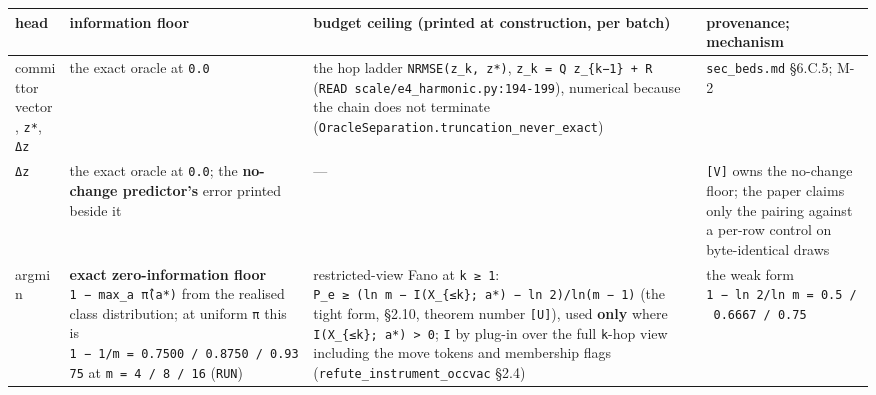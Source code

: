 \documentclass[11pt,a4paper]{article}
\newcounter{none}                 %
\theoremstyle{plain}
\theoremstyle{definition}
\theoremstyle{remark}
\begin{document}
{\def\LTcaptype{none} %
\begin{longtable}[]{@{}
  >{\raggedright\arraybackslash}p{}
  >{\raggedright\arraybackslash}p{}
  >{\raggedright\arraybackslash}p{}
  >{\raggedright\arraybackslash}p{}@{}}
\toprule\noalign{}
\begin{minipage}[b]{\linewidth}\raggedright
head
\end{minipage} & \begin{minipage}[b]{\linewidth}\raggedright
information floor
\end{minipage} & \begin{minipage}[b]{\linewidth}\raggedright
budget ceiling (printed at construction, per batch)
\end{minipage} & \begin{minipage}[b]{\linewidth}\raggedright
provenance; mechanism
\end{minipage} \\
\midrule\noalign{}
\endhead
\bottomrule\noalign{}
\endlastfoot
committor vector, \texttt{z*}, \texttt{Δz} & the exact oracle at
\texttt{0.0} & the hop ladder \texttt{NRMSE(z\_k,\ z*)},
\texttt{z\_k\ =\ Q\ z\_\{k−1\}\ +\ R}
(\texttt{READ\ scale/e4\_harmonic.py:194-199}), numerical because the
chain does not terminate
(\texttt{OracleSeparation.truncation\_never\_exact}) &
\texttt{sec\_beds.md} §6.C.5; M-2 \\
\texttt{Δz} & the exact oracle at \texttt{0.0}; the \textbf{no-change
predictor's} error printed beside it & --- &
\citep{vakalis-2026-interventiongap} \texttt{{[}V{]}} owns the no-change
floor; the paper claims only the pairing against a per-row control on
byte-identical draws \\
argmin & \textbf{exact zero-information floor}
\texttt{1\ −\ max\_a\ π̂(a*)} from the realised class distribution; at
uniform \texttt{π} this is
\texttt{1\ −\ 1/m\ =\ 0.7500\ /\ 0.8750\ /\ 0.9375} at
\texttt{m\ =\ 4\ /\ 8\ /\ 16} (\texttt{RUN}) & restricted-view Fano at
\texttt{k\ ≥\ 1}:
\texttt{P\_e\ ≥\ (ln\ m\ −\ I(X\_\{≤k\};\ a*)\ −\ ln\ 2)/ln(m\ −\ 1)}
(the tight form, \citep{cover-2006-elements} §2.10, theorem number
\texttt{{[}U{]}}), used \textbf{only} where
\texttt{I(X\_\{≤k\};\ a*)\ \textgreater{}\ 0}; \texttt{I} by plug-in
over the full \texttt{k}-hop view including the move tokens and
membership flags (\texttt{refute\_instrument\_occvac} §2.4) & the weak
form \texttt{1\ −\ ln\ 2/ln\ m\ =\ 0.5\ /\ 0.6667\ /\ 0.75}

\end{longtable}}
\end{document}
